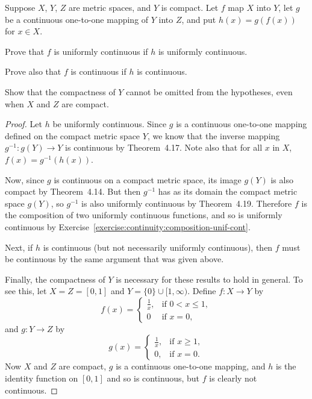  Suppose $X$, $Y$, $Z$ are metric spaces, and $Y$ is
compact. Let $f$ map $X$ into $Y$, let $g$ be a continuous one-to-one
mapping of $Y$ into $Z$, and put $h(x) = g(f(x))$ for $x\in X$.

Prove that $f$ is uniformly continuous if $h$ is uniformly continuous.

Prove also that $f$ is continuous if $h$ is continuous.

Show that the compactness of $Y$ cannot be omitted from the
hypotheses, even when $X$ and $Z$ are compact.
\begin{proof}
  Let $h$ be uniformly continuous. Since $g$ is a continuous
  one-to-one mapping defined on the compact metric space $Y$, we know
  that the inverse mapping $g^{-1}\colon g(Y)\to Y$ is continuous by
  Theorem~4.17. Note also that for all $x$ in $X$,
  $f(x) = g^{-1}(h(x))$.

  Now, since $g$ is continuous on a compact metric space, its image
  $g(Y)$ is also compact by Theorem~4.14. But then $g^{-1}$ has as its
  domain the compact metric space $g(Y)$, so $g^{-1}$ is also
  uniformly continuous by Theorem~4.19. Therefore $f$ is the
  composition of two uniformly continuous functions, and so is
  uniformly continuous by
  Exercise~\ref{exercise:continuity:composition-unif-cont}.

  Next, if $h$ is continuous (but not necessarily uniformly
  continuous), then $f$ must be continuous by the same argument that
  was given above.

  Finally, the compactness of $Y$ is necessary for these results to
  hold in general. To see this, let $X = Z = [0,1]$ and
  $Y = \{0\}\cup[1,\infty)$. Define $f\colon X\to Y$ by
  \begin{equation*}
    f(x) =
    \begin{cases}
      \frac1x, & \text{if $0 < x \leq 1$}, \\
      0 & \text{if $x = 0$},
    \end{cases}
  \end{equation*}
  and $g\colon Y\to Z$ by
  \begin{equation*}
    g(x) =
    \begin{cases}
      \frac1x, & \text{if $x\geq1$}, \\
      0, & \text{if $x = 0$}.
    \end{cases}
  \end{equation*}
  Now $X$ and $Z$ are compact, $g$ is a continuous one-to-one mapping,
  and $h$ is the identity function on $[0,1]$ and so is continuous,
  but $f$ is clearly not continuous.
\end{proof}

